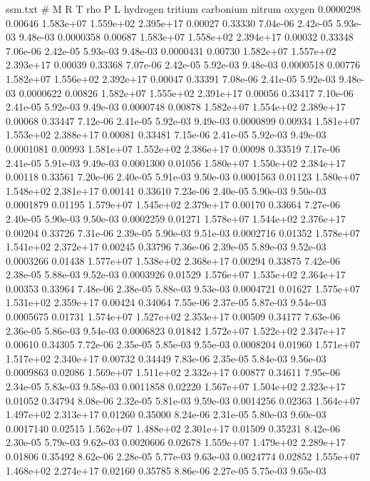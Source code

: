 \begin{filecontents}{ssm.txt}
# M R T rho P L hydrogen tritium carbonium nitrum oxygen
0.0000298 0.00646 1.583e+07 1.559e+02 2.395e+17 0.00027 0.33330 7.04e-06 2.42e-05 5.93e-03 9.48e-03
0.0000358 0.00687 1.583e+07 1.558e+02 2.394e+17 0.00032 0.33348 7.06e-06 2.42e-05 5.93e-03 9.48e-03
0.0000431 0.00730 1.582e+07 1.557e+02 2.393e+17 0.00039 0.33368 7.07e-06 2.42e-05 5.92e-03 9.48e-03
0.0000518 0.00776 1.582e+07 1.556e+02 2.392e+17 0.00047 0.33391 7.08e-06 2.41e-05 5.92e-03 9.48e-03
0.0000622 0.00826 1.582e+07 1.555e+02 2.391e+17 0.00056 0.33417 7.10e-06 2.41e-05 5.92e-03 9.49e-03
0.0000748 0.00878 1.582e+07 1.554e+02 2.389e+17 0.00068 0.33447 7.12e-06 2.41e-05 5.92e-03 9.49e-03
0.0000899 0.00934 1.581e+07 1.553e+02 2.388e+17 0.00081 0.33481 7.15e-06 2.41e-05 5.92e-03 9.49e-03
0.0001081 0.00993 1.581e+07 1.552e+02 2.386e+17 0.00098 0.33519 7.17e-06 2.41e-05 5.91e-03 9.49e-03
0.0001300 0.01056 1.580e+07 1.550e+02 2.384e+17 0.00118 0.33561 7.20e-06 2.40e-05 5.91e-03 9.50e-03
0.0001563 0.01123 1.580e+07 1.548e+02 2.381e+17 0.00141 0.33610 7.23e-06 2.40e-05 5.90e-03 9.50e-03
0.0001879 0.01195 1.579e+07 1.545e+02 2.379e+17 0.00170 0.33664 7.27e-06 2.40e-05 5.90e-03 9.50e-03
0.0002259 0.01271 1.578e+07 1.544e+02 2.376e+17 0.00204 0.33726 7.31e-06 2.39e-05 5.90e-03 9.51e-03
0.0002716 0.01352 1.578e+07 1.541e+02 2.372e+17 0.00245 0.33796 7.36e-06 2.39e-05 5.89e-03 9.52e-03
0.0003266 0.01438 1.577e+07 1.538e+02 2.368e+17 0.00294 0.33875 7.42e-06 2.38e-05 5.88e-03 9.52e-03
0.0003926 0.01529 1.576e+07 1.535e+02 2.364e+17 0.00353 0.33964 7.48e-06 2.38e-05 5.88e-03 9.53e-03
0.0004721 0.01627 1.575e+07 1.531e+02 2.359e+17 0.00424 0.34064 7.55e-06 2.37e-05 5.87e-03 9.54e-03
0.0005675 0.01731 1.574e+07 1.527e+02 2.353e+17 0.00509 0.34177 7.63e-06 2.36e-05 5.86e-03 9.54e-03
0.0006823 0.01842 1.572e+07 1.522e+02 2.347e+17 0.00610 0.34305 7.72e-06 2.35e-05 5.85e-03 9.55e-03
0.0008204 0.01960 1.571e+07 1.517e+02 2.340e+17 0.00732 0.34449 7.83e-06 2.35e-05 5.84e-03 9.56e-03
0.0009863 0.02086 1.569e+07 1.511e+02 2.332e+17 0.00877 0.34611 7.95e-06 2.34e-05 5.83e-03 9.58e-03
0.0011858 0.02220 1.567e+07 1.504e+02 2.323e+17 0.01052 0.34794 8.08e-06 2.32e-05 5.81e-03 9.59e-03
0.0014256 0.02363 1.564e+07 1.497e+02 2.313e+17 0.01260 0.35000 8.24e-06 2.31e-05 5.80e-03 9.60e-03
0.0017140 0.02515 1.562e+07 1.488e+02 2.301e+17 0.01509 0.35231 8.42e-06 2.30e-05 5.79e-03 9.62e-03
0.0020606 0.02678 1.559e+07 1.479e+02 2.289e+17 0.01806 0.35492 8.62e-06 2.28e-05 5.77e-03 9.63e-03
0.0024774 0.02852 1.555e+07 1.468e+02 2.274e+17 0.02160 0.35785 8.86e-06 2.27e-05 5.75e-03 9.65e-03

\end{filecontents}
